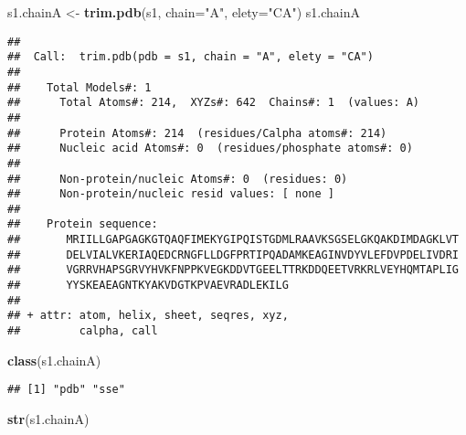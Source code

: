 \documentclass[]{article}
\newenvironment{Shaded}{\begin{snugshade}}{\end{snugshade}}
\newcommand{\DataTypeTok}[1]{\textcolor[rgb]{0.13,0.29,0.53}{#1}}
\newcommand{\KeywordTok}[1]{\textcolor[rgb]{0.13,0.29,0.53}{\textbf{#1}}}
\newcommand{\NormalTok}[1]{#1}
\newcommand{\StringTok}[1]{\textcolor[rgb]{0.31,0.60,0.02}{#1}}
\begin{document}
\begin{Shaded}
\begin{Highlighting}[]
\NormalTok{s1.chainA <-}\StringTok{ }\KeywordTok{trim.pdb}\NormalTok{(s1, }\DataTypeTok{chain=}\StringTok{"A"}\NormalTok{, }\DataTypeTok{elety=}\StringTok{"CA"}\NormalTok{)}
\NormalTok{s1.chainA}
\end{Highlighting}
\end{Shaded}

\begin{verbatim}
## 
##  Call:  trim.pdb(pdb = s1, chain = "A", elety = "CA")
## 
##    Total Models#: 1
##      Total Atoms#: 214,  XYZs#: 642  Chains#: 1  (values: A)
## 
##      Protein Atoms#: 214  (residues/Calpha atoms#: 214)
##      Nucleic acid Atoms#: 0  (residues/phosphate atoms#: 0)
## 
##      Non-protein/nucleic Atoms#: 0  (residues: 0)
##      Non-protein/nucleic resid values: [ none ]
## 
##    Protein sequence:
##       MRIILLGAPGAGKGTQAQFIMEKYGIPQISTGDMLRAAVKSGSELGKQAKDIMDAGKLVT
##       DELVIALVKERIAQEDCRNGFLLDGFPRTIPQADAMKEAGINVDYVLEFDVPDELIVDRI
##       VGRRVHAPSGRVYHVKFNPPKVEGKDDVTGEELTTRKDDQEETVRKRLVEYHQMTAPLIG
##       YYSKEAEAGNTKYAKVDGTKPVAEVRADLEKILG
## 
## + attr: atom, helix, sheet, seqres, xyz,
##         calpha, call
\end{verbatim}

\begin{Shaded}
\begin{Highlighting}[]
\KeywordTok{class}\NormalTok{(s1.chainA)}
\end{Highlighting}
\end{Shaded}

\begin{verbatim}
## [1] "pdb" "sse"
\end{verbatim}

\begin{Shaded}
\begin{Highlighting}[]
\KeywordTok{str}\NormalTok{(s1.chainA)}
\end{Highlighting}
\end{Shaded}
\end{document}
